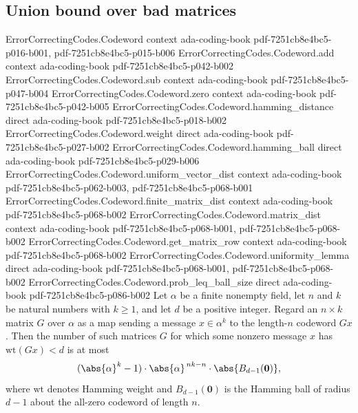 \subsection{Union bound over bad matrices}

\begin{theorem}
\label{ErrorCorrectingCodes.Codeword.existence_bound}
\leanok
{}
\proofstep
  {ErrorCorrectingCodes.Codeword}
  {context}
  {ada-coding-book}
  {pdf-7251cb8e4bc5-p016-b001,
    pdf-7251cb8e4bc5-p015-b006}
\proofstep
  {ErrorCorrectingCodes.Codeword.add}
  {context}
  {ada-coding-book}
  {pdf-7251cb8e4bc5-p042-b002}
\proofstep
  {ErrorCorrectingCodes.Codeword.sub}
  {context}
  {ada-coding-book}
  {pdf-7251cb8e4bc5-p047-b004}
\proofstep
  {ErrorCorrectingCodes.Codeword.zero}
  {context}
  {ada-coding-book}
  {pdf-7251cb8e4bc5-p042-b005}
\proofstep
  {ErrorCorrectingCodes.Codeword.hamming_distance}
  {direct}
  {ada-coding-book}
  {pdf-7251cb8e4bc5-p018-b002}
\proofstep
  {ErrorCorrectingCodes.Codeword.weight}
  {direct}
  {ada-coding-book}
  {pdf-7251cb8e4bc5-p027-b002}
\proofstep
  {ErrorCorrectingCodes.Codeword.hamming_ball}
  {direct}
  {ada-coding-book}
  {pdf-7251cb8e4bc5-p029-b006}
\proofstep
  {ErrorCorrectingCodes.Codeword.uniform_vector_dist}
  {context}
  {ada-coding-book}
  {pdf-7251cb8e4bc5-p062-b003,
    pdf-7251cb8e4bc5-p068-b001}
\proofstep
  {ErrorCorrectingCodes.Codeword.finite_matrix_dist}
  {context}
  {ada-coding-book}
  {pdf-7251cb8e4bc5-p068-b002}
\proofstep
  {ErrorCorrectingCodes.Codeword.matrix_dist}
  {context}
  {ada-coding-book}
  {pdf-7251cb8e4bc5-p068-b001,
    pdf-7251cb8e4bc5-p068-b002}
\proofstep
  {ErrorCorrectingCodes.Codeword.get_matrix_row}
  {context}
  {ada-coding-book}
  {pdf-7251cb8e4bc5-p068-b002}
\proofstep
  {ErrorCorrectingCodes.Codeword.uniformity_lemma}
  {direct}
  {ada-coding-book}
  {pdf-7251cb8e4bc5-p068-b001,
    pdf-7251cb8e4bc5-p068-b002}
\proofstep
  {ErrorCorrectingCodes.Codeword.prob_leq_ball_size}
  {direct}
  {ada-coding-book}
  {pdf-7251cb8e4bc5-p086-b002}
Let $\alpha$ be a finite nonempty field, let $n$ and $k$ be natural numbers with $k \ge
1$, and let $d$ be a positive integer. Regard an $n \times k$ matrix $G$ over $\alpha$
as a map sending a message $x \in \alpha^{k}$ to the length-$n$ codeword $Gx$. Then the
number of such matrices $G$ for which some nonzero message $x$ has $\mathrm{wt}(Gx) < d$
is at most
\[
(\abs{\alpha}^{k} - 1)\cdot \abs{\alpha}^{\,nk - n}\cdot \abs{B_{d-1}(\mathbf 0)},
\]
where $\mathrm{wt}$ denotes Hamming weight and $B_{d-1}(\mathbf 0)$ is the Hamming ball
of radius $d-1$ about the all-zero codeword of length $n$.
\end{theorem}

